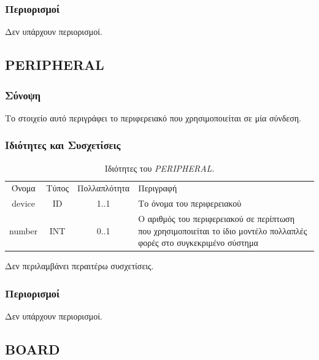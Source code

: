 \subsubsection*{Περιορισμοί}

\noindent Δεν υπάρχουν περιορισμοί.

\subsection{PERIPHERAL}
\label{subsec:peripheral_con}

\subsubsection*{Σύνοψη}

\noindent Το στοιχείο αυτό περιγράφει το περιφερειακό που χρησιμοποιείται σε μία σύνδεση.

\subsubsection*{Ιδιότητες και Συσχετίσεις}

\begin{table}[H]
	\begin{center}
		\begin{tabular}{ | c | c | c| m{5.5cm} | }
			\hline
			\rowcolor{Gray}
			\multicolumn{4}{|c|}{\textbf{Ιδιότητες}}\\
			\hline
			\rowcolor{Gray}
			Όνομα & Τύπος & Πολλαπλότητα & Περιγραφή \\
			\hline
			device & ID & 1..1 & Το όνομα του περιφερειακού \\
			\hline
		    number & INT & 0..1 & Ο αριθμός του περιφερειακού σε περίπτωση που χρησιμοποιείται το ίδιο μοντέλο πολλαπλές φορές στο συγκεκριμένο σύστημα \\
			\hline
		\end{tabular}
		\caption{Ιδιότητες του \textit{PERIPHERAL}.}
		\label{tab:peripheral_con}
	\end{center}
\end{table}

\noindent Δεν περιλαμβάνει περαιτέρω συσχετίσεις.

\subsubsection*{Περιορισμοί}

\noindent Δεν υπάρχουν περιορισμοί.

\subsection{BOARD}
\label{subsec:board_con}

